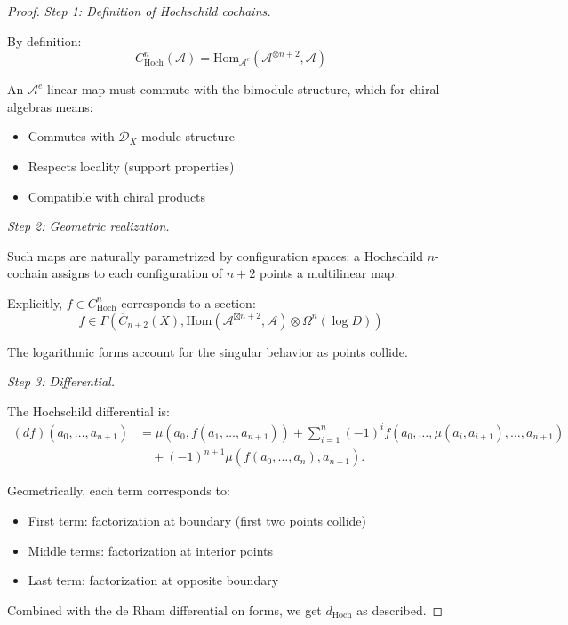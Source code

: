 \begin{proof}
\emph{Step 1: Definition of Hochschild cochains.}

By definition:
\[C^n_{\text{Hoch}}(\mathcal{A}) = \text{Hom}_{\mathcal{A}^e}(\mathcal{A}^{\otimes n+2}, \mathcal{A})\]

An $\mathcal{A}^e$-linear map must commute with the bimodule structure, which for chiral
algebras means:
\begin{itemize}
\item Commutes with $\mathcal{D}_X$-module structure
\item Respects locality (support properties)
\item Compatible with chiral products
\end{itemize}

\emph{Step 2: Geometric realization.}

Such maps are naturally parametrized by configuration spaces: a Hochschild $n$-cochain
assigns to each configuration of $n+2$ points a multilinear map.

Explicitly, $f \in C^n_{\text{Hoch}}$ corresponds to a section:
\[f \in \Gamma(\overline{C}_{n+2}(X), \text{Hom}(\mathcal{A}^{\boxtimes n+2}, \mathcal{A}) 
\otimes \Omega^n(\log D))\]

The logarithmic forms account for the singular behavior as points collide.

\emph{Step 3: Differential.}

The Hochschild differential is:
\begin{align*}
(df)(a_0, \ldots, a_{n+1})
&= \mu(a_0, f(a_1, \ldots, a_{n+1}))
 + \sum_{i=1}^n (-1)^i f(a_0, \ldots, \mu(a_i, a_{i+1}), \ldots, a_{n+1}) \\
&\quad + (-1)^{n+1}\mu(f(a_0, \ldots, a_n), a_{n+1}).
\end{align*}

Geometrically, each term corresponds to:
\begin{itemize}
\item First term: factorization at boundary (first two points collide)
\item Middle terms: factorization at interior points  
\item Last term: factorization at opposite boundary
\end{itemize}

Combined with the de Rham differential on forms, we get $d_{\text{Hoch}}$ as described.
\end{proof}

